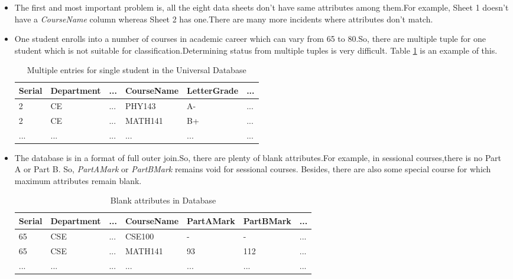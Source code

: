 \begin{itemize}
\item The first and most important problem is, all the eight data sheets don't have same attributes among them.For example, Sheet 1 doesn't have a \textit{CourseName} column whereas Sheet 2 has one.There are many more incidents where attributes don't match.
\item One student enrolls into a number of courses in academic career which can vary from 65 to 80.So, there are multiple tuple for one student which is not suitable for classification.Determining status from multiple tuples is very difficult. Table \ref{tab:t1} is an example of this.
\begin {table}[H]
\caption {Multiple entries for single student in the Universal Database} \label{tab:t1} 
\begin{center}
\begin{tabular}{ | m{2cm} | m{2cm}| m{0.5cm} | m{3cm} | m{2cm} | m{0.5cm} | } 
\hline
Serial & Department & ... & CourseName & LetterGrade & ... \\ 
\hline
2 & CE & ... & PHY143 & A- & ... \\ 
\hline
2 & CE & ... & MATH141 & B+ & ... \\ 
\hline
... & ... & ... & ... & ... & ... \\ 
\hline
\end{tabular}
\end{center}
\end{table}
\item The database is in a format of full outer join.So, there are plenty of blank attributes.For example, in sessional courses,there is no Part A or Part B. So, \textit{PartAMark} or \textit{PartBMark} remains void for sessional courses. Besides, there are also some special course for which maximum attributes remain blank. 
\begin {table}[H]
\caption {Blank attributes in Database} \label{tab:title} 
\begin{center}
\begin{tabular}{ | m{1cm} | m{2cm}| m{0.5cm}| m{2cm} | m{2cm} | m{2cm} |  m{0.5cm} | } 
\hline
Serial & Department & ... & CourseName & PartAMark & PartBMark & ... \\ 
\hline
65 & CSE & ... & CSE100 & - & - & ... \\ 
\hline
65 & CSE & ... & MATH141 & 93 & 112 & ... \\ 
\hline
... & ... & ... & ... & ... & ... & ... \\ 
\hline
\end{tabular}

\end{center}
\end{table}
\end{itemize}

